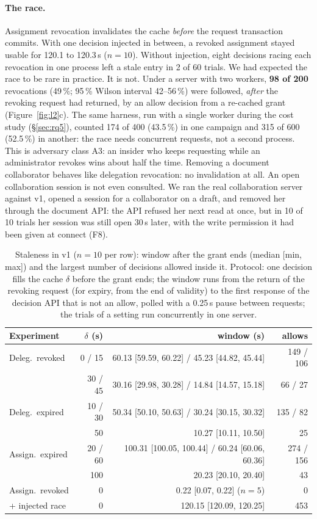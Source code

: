 \paragraph{The race.} Assignment revocation invalidates the cache \emph{before} the request transaction commits.
With one decision injected in between, a revoked assignment stayed usable for 120.1 to 120.3\,s ($n=10$).
Without injection, eight decisions racing each revocation in one process left a stale entry in 2 of 60 trials.
We had expected the race to be rare in practice. It is not. Under a server with two workers, \textbf{98 of 200}
revocations (49\,\%; 95\,\% Wilson interval 42--56\,\%) were followed, \emph{after} the revoking request had returned, by an allow decision from a
re-cached grant (Figure~\ref{fig:l2}c). The same harness, run with a single worker during the cost study
(\S\ref{sec:rq5}), counted 174 of 400 (43.5\,\%) in one campaign and 315 of 600 (52.5\,\%) in another: the race
needs concurrent requests, not a second process.
This is adversary class A3: an insider who keeps requesting while an
administrator revokes wins about half the time. Removing a document collaborator behaves like delegation
revocation: no invalidation at all. An open collaboration session is not even consulted. We ran the real
collaboration server against v1, opened a session for a collaborator on a draft, and removed her through the
document API: the API refused her next read at once, but in 10 of 10 trials her session was still open 30\,s
later, with the write permission it had been given at connect (F8).

\begin{table}[t]
\caption{Staleness in v1 ($n=10$ per row): window after the grant ends (median [min, max]) and the largest number
of decisions allowed inside it. Protocol: one decision fills the cache $\delta$ before the grant ends; the window
runs from the return of the revoking request (for expiry, from the end of validity) to the first response of the
decision API that is not an allow, polled with a 0.25\,s pause between requests; the trials of a setting run
concurrently in one server.}
\label{tab:e2}
\footnotesize
\begin{tabular}{@{}l@{\;}r@{\;\;}r@{\;\;}r@{}}
\toprule
Experiment & $\delta$ (s) & window (s) & allows \\
\midrule
Deleg.\ revoked & 0 / 15 & 60.13 [59.59, 60.22] / 45.23 [44.82, 45.44] & 149 / 106 \\
 & 30 / 45 & 30.16 [29.98, 30.28] / 14.84 [14.57, 15.18] & 66 / 27 \\
Deleg.\ expired & 10 / 30 & 50.34 [50.10, 50.63] / 30.24 [30.15, 30.32] & 135 / 82 \\
 & 50 & 10.27 [10.11, 10.50] & 25 \\
Assign.\ expired & 20 / 60 & 100.31 [100.05, 100.44] / 60.24 [60.06, 60.36] & 274 / 156 \\
 & 100 & 20.23 [20.10, 20.40] & 43 \\
Assign.\ revoked & 0 & 0.22 [0.07, 0.22] ($n=5$) & 0 \\
\quad + injected race & 0 & 120.15 [120.09, 120.25] & 453 \\
\bottomrule
\end{tabular}
\end{table}

